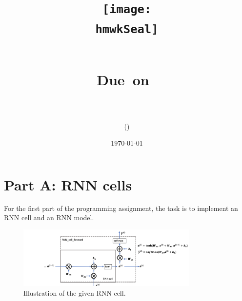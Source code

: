 \documentclass{article}
\title{
	\centering
	\texttt{[image: \\hmwkSeal]}
	
	\vspace{1in}
	\textmd{\textbf{\hmwkClass\ \hmwkTitle}}\\
	
	\normalsize\vspace{0.1in}\small{Due\ on\ \hmwkDueDate}\\
	
	\vspace{0.1in}
	\large{\textit{\hmwkClassInstructor}} \\
	\vspace{0.5in}
	
	\large{\hmwkUniversity}
	
	\vspace{3in}
	
	\author{\textbf{\hmwkAuthorName} (\hmwkAuthorID)}
	\date{\today}
}
\begin{document}
	
	\maketitle
	
	\pagebreak
	
\section{Part A: RNN cells}

For the first part of the programming assignment, the task is to implement an RNN cell and an RNN model. 

\begin{figure}[h]
	\centering
	\includegraphics[width=0.8\textwidth]{images/RNN_cell_forward.png}
	\caption{Illustration of the given RNN cell.}
\end{figure}
\end{document}
